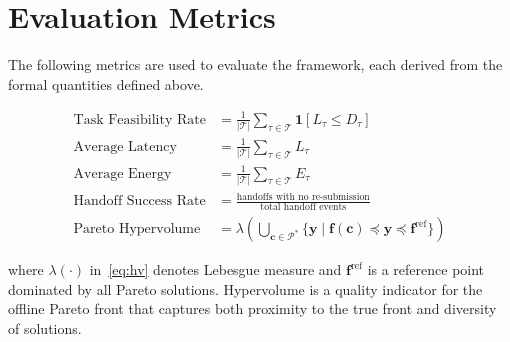 \documentclass[12pt,a4paper]{article}
\theoremstyle{definition}
\theoremstyle{remark}
\begin{document}
\section{Evaluation Metrics}
\label{sec:metrics}

The following metrics are used to evaluate the framework, each derived from
the formal quantities defined above.

\begin{align}
  \text{Task Feasibility Rate} &=
  \frac{1}{|\mathcal{T}|} \sum_{\tau \in \mathcal{T}}
  \mathbf{1}[L_\tau \leq D_\tau]
  \label{eq:feasibility}\\[6pt]
  \text{Average Latency} &= \frac{1}{|\mathcal{T}|}
  \sum_{\tau \in \mathcal{T}} L_\tau
  \label{eq:avg_latency}\\[6pt]
  \text{Average Energy} &= \frac{1}{|\mathcal{T}|}
  \sum_{\tau \in \mathcal{T}} E_\tau
  \label{eq:avg_energy}\\[6pt]
  \text{Handoff Success Rate} &=
  \frac{\text{handoffs with no re-submission}}{\text{total handoff events}}
  \label{eq:handoff}\\[6pt]
  \text{Pareto Hypervolume} &= \lambda\!\left(
  \bigcup_{\mathbf{c} \in \mathcal{P}^*}
  \bigl\{ \bm{y} \;\big|\; \bm{f}(\mathbf{c}) \preceq \bm{y} \preceq \bm{f}^{\text{ref}} \bigr\}
  \right)
  \label{eq:hv}
\end{align}

where $\lambda(\cdot)$ in~\eqref{eq:hv} denotes Lebesgue measure and
$\bm{f}^{\text{ref}}$ is a reference point dominated by all Pareto solutions.
Hypervolume is a quality indicator for the offline Pareto front that captures
both proximity to the true front and diversity of solutions.
\end{document}
